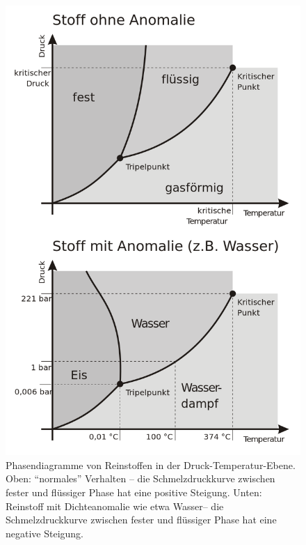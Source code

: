 \begin{figure}[!ht]
    \centering
%    
    \includegraphics[width=0.6\linewidth]{img/Phasendiagramme.png}
    \caption{Phasendiagramme von Reinstoffen in der Druck-Temperatur-Ebene. Oben: ``normales'' Verhalten – die Schmelzdruckkurve zwischen fester und flüssiger Phase hat eine positive Steigung. Unten: Reinstoff mit Dichteanomalie wie etwa Wasser– die Schmelzdruckkurve zwischen fester und flüssiger Phase hat eine negative Steigung.   }
\end{figure}

